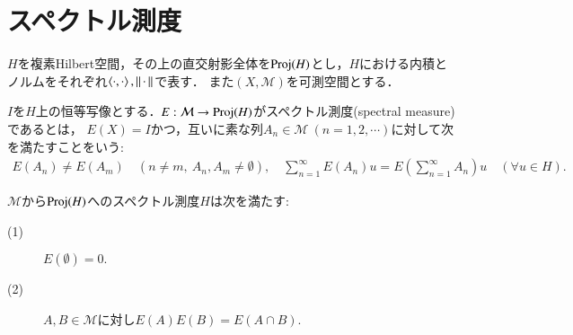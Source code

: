\section{スペクトル測度}
	$H$を複素Hilbert空間，その上の直交射影全体を$\mathrm{Proj}( H )$とし，$H$における内積とノルムをそれぞれ$\inprod<\cdot,\cdot>,\Norm{\cdot}{}$で表す．
	また$(X,\mathcal{M})$を可測空間とする．
	
	\begin{screen}
		\begin{dfn}[スペクトル測度]
			$I$を$H$上の恒等写像とする．$E:\mathcal{M} \rightarrow \mathrm{Proj}( H )$がスペクトル測度(spectral measure)であるとは，
			$E(X) = I$かつ，互いに素な列$A_n \in \mathcal{M}\ (n=1,2,\cdots)$に対して次を満たすことをいう:
			\begin{align}
				E(A_n) \neq E(A_m) \quad (n \neq m,\ A_n,A_m \neq \emptyset), \quad
				\sum_{n=1}^{\infty} E(A_n)u = E(\sum_{n=1}^{\infty} A_n)u \quad (\forall u \in H).
				\label{eq:sigma_additivity_spectral_measures}
			\end{align}
			\label{dfn:spectral_measure}
		\end{dfn}
	\end{screen}
	
	\begin{screen}
		\begin{lem}[スペクトル測度の積]
			$\mathcal{M}$から$\mathrm{Proj}( H )$へのスペクトル測度$H$は次を満たす:
			\begin{description}
				\item[(1)] $E(\emptyset) = 0.$
				\item[(2)] $A,B \in \mathcal{M}$に対し$E(A) E(B) = E(A \cap B)$.
			\end{description}
			\label{lem:product_of_spectral_measure}
		\end{lem}
	\end{screen}
	
